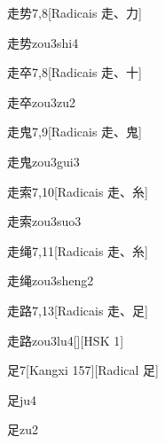 \begin{entry}{走势}{7,8}[Radicais ⾛、⼒]
  \begin{phonetics}{走势}{zou3shi4}
  \end{phonetics}
\end{entry}

\begin{entry}{走卒}{7,8}[Radicais ⾛、⼗]
  \begin{phonetics}{走卒}{zou3zu2}
  \end{phonetics}
\end{entry}

\begin{entry}{走鬼}{7,9}[Radicais ⾛、⿁]
  \begin{phonetics}{走鬼}{zou3gui3}
  \end{phonetics}
\end{entry}

\begin{entry}{走索}{7,10}[Radicais ⾛、⽷]
  \begin{phonetics}{走索}{zou3suo3}
  \end{phonetics}
\end{entry}

\begin{entry}{走绳}{7,11}[Radicais ⾛、⽷]
  \begin{phonetics}{走绳}{zou3sheng2}
  \end{phonetics}
\end{entry}

\begin{entry}{走路}{7,13}[Radicais ⾛、⾜]
  \begin{phonetics}{走路}{zou3lu4}[][HSK 1]
  \end{phonetics}
\end{entry}

\begin{entry}{足}{7}[Kangxi 157][Radical ⾜]
  \begin{phonetics}{足}{ju4}
  \end{phonetics}
  \begin{phonetics}{足}{zu2}
  \end{phonetics}
\end{entry}

